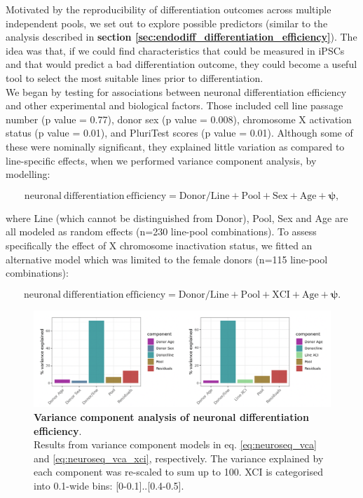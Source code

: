 Motivated by the reproducibility of differentiation outcomes across multiple independent pools, we set out to explore possible predictors (similar to the analysis described in \textbf{section \ref{sec:endodiff_differentiation_efficiency}}).
The idea was that, if we could find characteristics that could be measured in iPSCs and that would predict a bad differentiation outcome, they could become a useful tool to select the most suitable lines prior to differentiation. \\

We began by testing for associations between neuronal differentiation efficiency and other experimental and biological factors.
Those included cell line passage number (p value = 0.77), donor sex (p value = 0.008), chromosome X activation status (p value = 0.01), and PluriTest scores \cite{muller2011bioinformatic} (p value = 0.01).
Although some of these were nominally significant, they explained little variation as compared to line-specific effects, when we performed variance component analysis, by modelling:

\begin{equation}\label{eq:neuroseq_vca}
    \mathrm{neuronal \ differentiation \ efficiency = Donor/Line + Pool + Sex + Age + \boldsymbol{\psi}},
\end{equation}

where Line (which cannot be distinguished from Donor), Pool, Sex and Age are all modeled as random effects (n=230 line-pool combinations).
To assess specifically the effect of X chromosome inactivation status, we fitted an alternative model which was limited to the female donors (n=115 line-pool combinations):

\begin{equation}\label{eq:neuroseq_vca_xci}
    \mathrm{neuronal \ differentiation \ efficiency = Donor/Line + Pool + XCI + Age + \boldsymbol{\psi}}. 
\end{equation}

\begin{figure}[htbp]
\centering
\includegraphics[width=16cm]{Chapter5/Fig/neuroseq_diff_eff_vca.png}
\caption[Variance component analysis of neuronal differentiation efficiency]{\textbf{Variance component analysis of neuronal differentiation efficiency}.\\
Results from variance component models in eq. \eqref{eq:neuroseq_vca} and \eqref{eq:neuroseq_vca_xci}, respectively.
The variance explained by each component was re-scaled to sum up to 100.
XCI is categorised into 0.1-wide bins: [0-0.1]..[0.4-0.5].}
\label{fig:neuroseq_diff_eff_vca}
\end{figure}

